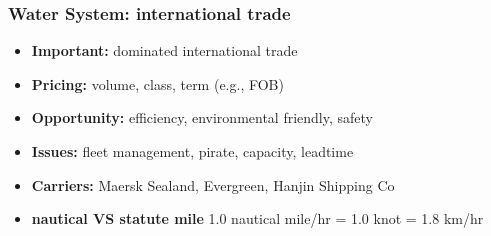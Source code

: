 \documentclass[10pt,presentation]{beamer}
\begin{document}
\begin{frame}
  \frametitle{Water System: international trade }

  \begin{itemize}
    \item \textbf{Important:} dominated international trade
    \item \textbf{Pricing:} volume, class, term (e.g., FOB)
    \item \textbf{Opportunity:} \alert{efficiency}, environmental friendly, safety
    \item \textbf{Issues:} \alert{fleet management}, pirate, capacity, leadtime
    \item \textbf{Carriers:} Maersk Sealand, Evergreen, Hanjin Shipping Co
    \item \textbf{nautical VS statute mile}  1.0 nautical mile/hr = 1.0 knot = 1.8 km/hr
  \end{itemize}


  \end{frame}
\end{document}
